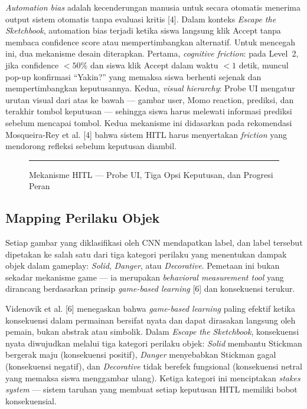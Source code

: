 \documentclass[12pt,oneside]{report}
\begin{document}
\textit{Automation bias} adalah kecenderungan manusia untuk secara otomatis menerima output sistem otomatis tanpa evaluasi kritis [4]. Dalam konteks \textit{Escape the Sketchbook}, automation bias terjadi ketika siswa langsung klik Accept tanpa membaca confidence score atau mempertimbangkan alternatif. Untuk mencegah ini, dua mekanisme desain diterapkan. Pertama, \textit{cognitive friction}: pada Level~2, jika confidence $< 50\%$ dan siswa klik Accept dalam waktu $< 1$ detik, muncul pop-up konfirmasi ``Yakin?'' yang memaksa siswa berhenti sejenak dan mempertimbangkan keputusannya. Kedua, \textit{visual hierarchy}: Probe UI mengatur urutan visual dari atas ke bawah --- gambar user, Momo reaction, prediksi, dan terakhir tombol keputusan --- sehingga siswa harus melewati informasi prediksi sebelum mencapai tombol. Kedua mekanisme ini didasarkan pada rekomendasi Mosqueira-Rey et al. [4] bahwa sistem HITL harus menyertakan \textit{friction} yang mendorong refleksi sebelum keputusan diambil.

\begin{figure}[H]
    \centering
    \rule{0.9\textwidth}{6cm}
    \caption{Mekanisme HITL --- Probe UI, Tiga Opsi Keputusan, dan Progresi Peran}
    \label{fig:mekanisme-hitl}
\end{figure}


\subsection{Mapping Perilaku Objek}
\label{subsec:mapping-perilaku-objek}

Setiap gambar yang diklasifikasi oleh CNN mendapatkan label, dan label tersebut dipetakan ke salah satu dari tiga kategori perilaku yang menentukan dampak objek dalam gameplay: \textit{Solid}, \textit{Danger}, atau \textit{Decorative}. Pemetaan ini bukan sekadar mekanisme game --- ia merupakan \textit{behavioral measurement tool} yang dirancang berdasarkan prinsip \textit{game-based learning} [6] dan konsekuensi terukur.

Videnovik et al. [6] menegaskan bahwa \textit{game-based learning} paling efektif ketika konsekuensi dalam permainan bersifat nyata dan dapat dirasakan langsung oleh pemain, bukan abstrak atau simbolik. Dalam \textit{Escape the Sketchbook}, konsekuensi nyata diwujudkan melalui tiga kategori perilaku objek: \textit{Solid} membantu Stickman bergerak maju (konsekuensi positif), \textit{Danger} menyebabkan Stickman gagal (konsekuensi negatif), dan \textit{Decorative} tidak berefek fungsional (konsekuensi netral yang memaksa siswa menggambar ulang). Ketiga kategori ini menciptakan \textit{stakes system} --- sistem taruhan yang membuat setiap keputusan HITL memiliki bobot konsekuensial.
\end{document}
